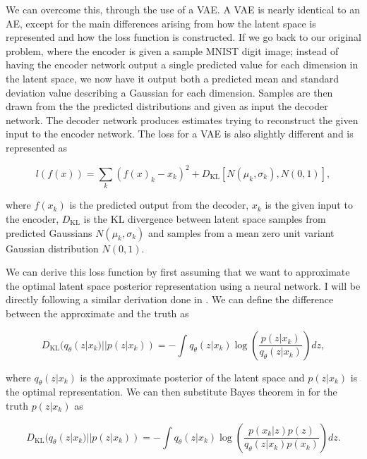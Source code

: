 We can overcome this, through the use of a \ac{VAE}. 
A \ac{VAE} is nearly identical to an \ac{AE}, except for 
the main differences arising from how the latent space 
is represented and how the loss function is constructed. 
If we go back to our original problem, where the encoder is given 
a sample MNIST digit image; instead of having the encoder network 
output a single predicted value for each dimension in the 
latent space, we now have it output both a predicted 
mean and standard deviation value describing a Gaussian 
for each dimension. Samples are then drawn from the the 
predicted distributions and given as input the decoder network. 
The decoder network produces estimates trying to reconstruct 
the given input to the encoder network. The loss for 
a \ac{VAE} is also slightly different and is represented 
as 

\begin{equation}
    l(f(x)) = \sum_k{ (f(x)_k - x_k)^2 + 
    D_{\textrm{KL}}[N(\mu_k, \sigma_k), N(0, 1)]},
\end{equation}

where $f(x_k)$ is the predicted output from the decoder, $x_k$
is the given input to the encoder, $D_{\textrm{KL}}$ is the \ac{KL} divergence 
between latent space samples from predicted Gaussians $N(\mu_k, \sigma_k)$ 
and samples from a mean zero unit variant Gaussian 
distribution $N(0,1)$. 

We can derive this loss function by first assuming that we 
want to approximate the optimal latent space posterior 
representation using a neural network. I will be directly following a 
similar derivation done in \cite{1907.08956}. We can define the 
difference between the approximate and the truth as 

\begin{equation}
    D_{\textrm{KL}}(q_{\theta}(z|x_k) || p(z|x_k)) = -\int q_{\theta}(z|x_k) \log(\frac{p(z|x_k)}{q_{\theta}(z|x_k)}) dz,
\end{equation}

where $q_{\theta}(z|x_k)$ is the approximate posterior of the 
latent space and $p(z|x_k)$ is the optimal representation. 
We can then substitute Bayes theorem in for the truth 
$p(z|x_k)$ as 

\begin{equation}
    D_{\textrm{KL}}(q_{\theta}(z|x_k) || p(z|x_k)) = -\int q_{\theta}(z|x_k) 
    \log(\frac{p(x_k|z) p(z)}{q_{\theta}(z|x_k) p(x_k)}) dz. 
\end{equation}

